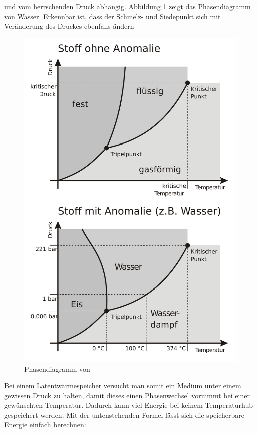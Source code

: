 \documentclass[11pt,a4paper]{scrartcl}
\begin{document}
und vom herrschenden Druck abhängig. Abbildung \ref{fig:H2O2} zeigt das
Phasendiagramm von Wasser. Erkennbar ist, dass der Schmelz- und Siedepunkt sich
mit Veränderung des Druckes ebenfalls ändern
\begin{figure}[h!]
\begin{center}
\includegraphics[scale=0.6]{images/Phasendiagramm2d.pdf}
\caption{Phasendiagramm von  \cite{Phasendiagramm}}
\label{fig:H2O2}
\end{center}
\end{figure}
Bei einem Latentwärmespeicher versucht man somit ein Medium unter einem gewissen
Druck zu halten, damit dieses einen Phasenwechsel vornimmt bei einer gewünschten
Temperatur. Dadurch kann viel Energie bei keinem Temperaturhub gespeichert
werden. Mit der untenstehenden Formel lässt sich die speicherbare Energie
einfach berechnen:
\end{document}
